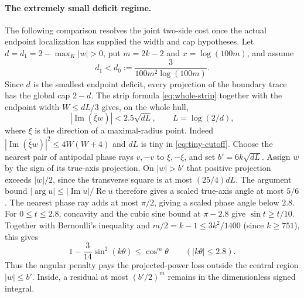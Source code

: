 \documentclass[11pt]{article}
\begin{document}
	\paragraph{The extremely small deficit regime.}
	The following comparison resolves the joint two-side cost once the
	actual endpoint localization has supplied the width and cap hypotheses.
	Let $d=d_1=2-\max_K|w|>0$, put $m=2k-2$ and $x=\log(100m)$, and assume
	\begin{equation}\label{eq:tiny-cutoff}
		d_1<d_0:=\frac{3}{100m^2\log(100m)}.
	\end{equation}
	Since $d$ is the smallest endpoint deficit, every projection of
	the boundary trace has the global cap $2-d$.  The strip formula
	\eqref{eq:whole-strip} together with the endpoint width
	$W\leq dL/3$ gives, on the whole hull,
	\[
	|\operatorname{Im}(\bar\xi w)|<2.5\sqrt{dL},
	\qquad L=\log(2/d),
	\]
	where $\xi$ is the direction of a maximal-radius point.  Indeed
	$|\operatorname{Im}(\bar\xi w)|^2\leq4W(W+4)$ and
	$dL$ is tiny in \eqref{eq:tiny-cutoff}.
	Choose the nearest pair of antipodal phase rays $v,-v$ to
	$\xi,-\xi$, and set $b'=6k\sqrt{dL}$.  Assign $w$ by the sign
	of its true-axis projection.  On $|w|>b'$ that positive projection
	exceeds $|w|/2$, since the transverse square is at most
	$(25/4)dL$.  The argument bound $|\arg u|\leq|\operatorname{Im}u|/
	\operatorname{Re}u$ therefore gives a scaled true-axis angle at
	most $5/6$.  The nearest phase ray adds at most $\pi/2$, giving
	a scaled phase angle below $2.8$.
	For $0\leq t\leq2.8$, concavity and the cubic sine bound at
	$\pi-2.8$ give $\sin t\geq t/10$.  Together with Bernoulli's
	inequality and $m/2=k-1\leq 3k^2/1400$ (since $k\geq751$), this gives
	\[
	1-\frac3{14}\sin^2(k\theta)\leq\cos^m\theta
	\qquad(|k\theta|\leq2.8).
	\]
	Thus the angular penalty pays the projected-power loss outside
	the central region $|w|\leq b'$.
	Inside, a residual at most $(b'/2)^m$ remains in the dimensionless
	signed integral.
	
\end{document}
